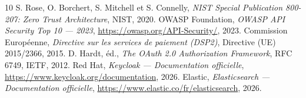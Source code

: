 \documentclass{mpssi_cls}
\begin{document}
\clearpage


\clearpage
\ifdefined\printbibliography
  \printbibliography
\else
  \begin{thebibliography}{10}
   S. Rose, O. Borchert, S. Mitchell et S. Connelly, \textit{NIST Special Publication 800-207: Zero Trust Architecture}, NIST, 2020.
   OWASP Foundation, \textit{OWASP API Security Top 10 --- 2023}, \url{https://owasp.org/API-Security/}, 2023.
   Commission Européenne, \textit{Directive sur les services de paiement (DSP2)}, Directive (UE) 2015/2366, 2015.
   D. Hardt, éd., \textit{The OAuth 2.0 Authorization Framework}, RFC 6749, IETF, 2012.
   Red Hat, \textit{Keycloak --- Documentation officielle}, \url{https://www.keycloak.org/documentation}, 2026.
   Elastic, \textit{Elasticsearch --- Documentation officielle}, \url{https://www.elastic.co/fr/elasticsearch}, 2026.
  \end{thebibliography}
\fi
\end{document}
